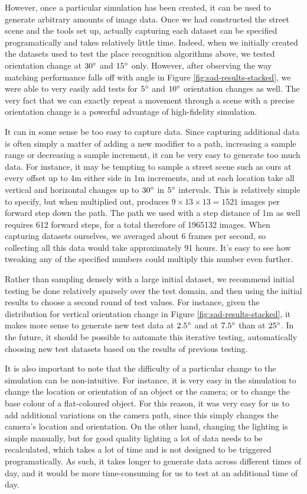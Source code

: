 \documentclass[letterpaper, 10 pt, conference]{ieeeconf}  %
\begin{document}
However, once a particular simulation has been created, it can be used to generate arbitrary amounts of image data. Once we had constructed the street scene and the tools set up, actually capturing each dataset can be specified programatically and takes relatively little time. Indeed, when we initially created the  datasets used to test the place recognition algorithms above, we tested orientation change at $30\degree$ and $15\degree$ only. However, after observing the way matching performance falls off with angle in Figure \ref{fig:sad-results-stacked}, we were able to very easily add tests for $5\degree$ and $10\degree$ orientation changes as well. The very fact that we can exactly repeat a movement through a scene with a precise orientation change is a powerful advantage of high-fidelity simulation.

It can in some sense be too easy to capture data. Since capturing additional data is often simply a matter of adding a new modifier to a path, increasing a sample range or decreasing a sample increment, it can be very easy to generate too much data. For instance, it may be tempting to sample a street scene such as ours at every offset up to 4m either side in 1m increments, and at each location take all vertical and horizontal changes up to $30\degree$ in $5\degree$ intervals. This is relatively simple to specify, but when multiplied out, produces $9 \times 13 \times 13 = 1521$ images per forward step down the path. The path we used with a step distance of 1m as well requires 612 forward steps, for a total therefore of 1965132 images. When capturing datasets ourselves, we averaged about 6 frames per second, so collecting all this data would take approximately 91 hours. It's easy to see how tweaking any of the specified numbers could multiply this number even further.

Rather than sampling densely with a large initial dataset, we recommend initial testing be done relatively sparsely over the test domain, and then using the initial results to choose a second round of test values. For instance, given the distribution for vertical orientation change in Figure \ref{fig:sad-results-stacked}, it makes more sense to generate new test data at $2.5\degree$ and at $7.5\degree$ than at $25\degree$. In the future, it should be possible to automate this iterative testing, automatically choosing new test datasets based on the results of previous testing.

It is also important to note that the difficulty of a particular change to the simulation can be non-intuitive. For instance, it is very easy in the simulation to change the location or orientation of an object or the camera; or to change the base colour of a flat-coloured object. For this reason, it was very easy for us to add additional variations on the camera path, since this simply changes the camera's location and orientation. On the other hand, changing the lighting is simple manually, but for good quality lighting a lot of data needs to be recalculated, which takes a lot of time and is not designed to be triggered programatically. As such, it takes longer to generate data across different times of day, and it would be more time-consuming for us to test at an additional time of day.
\end{document}

